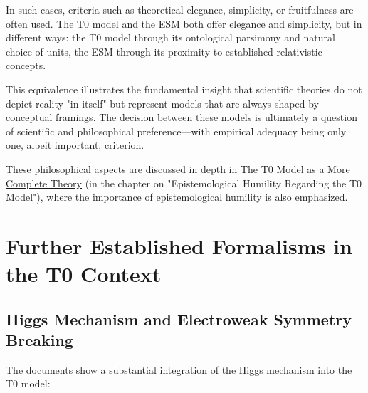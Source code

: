 \documentclass[12pt,a4paper]{article}
\begin{document}
	In such cases, criteria such as theoretical elegance, simplicity, or fruitfulness are often used. The T0 model and the ESM both offer elegance and simplicity, but in different ways: the T0 model through its ontological parsimony and natural choice of units, the ESM through its proximity to established relativistic concepts.
	
	This equivalence illustrates the fundamental insight that scientific theories do not depict reality "in itself" but represent models that are always shaped by conceptual framings. The decision between these models is ultimately a question of scientific and philosophical preference—with empirical adequacy being only one, albeit important, criterion.
	
	These philosophical aspects are discussed in depth in \href{https://github.com/jpascher/T0-Time-Mass-Duality/tree/main/2/pdf/English/T0-ModelAsCompleteTheory_En.pdf}{The T0 Model as a More Complete Theory} (in the chapter on "Epistemological Humility Regarding the T0 Model"), where the importance of epistemological humility is also emphasized.
	
	\section{Further Established Formalisms in the T0 Context}
	\label{sec:other_formalisms}
	
	\subsection{Higgs Mechanism and Electroweak Symmetry Breaking}
	\label{subsec:higgs_mechanism}
	
	The documents show a substantial integration of the Higgs mechanism into the T0 model:
	
\end{document}
